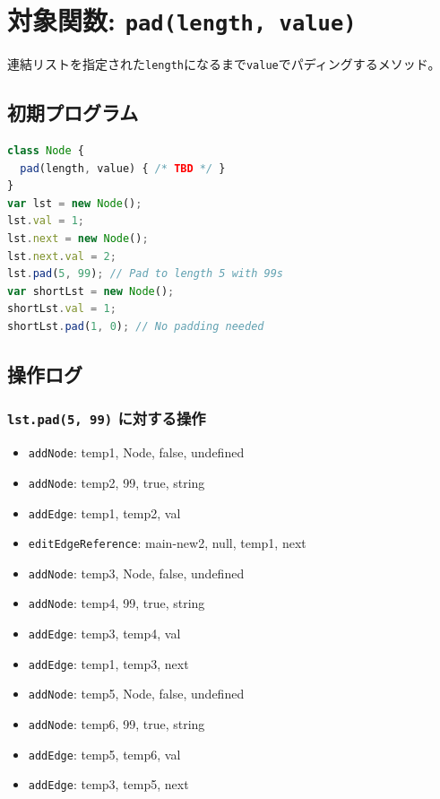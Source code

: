 \documentclass{article}
\begin{document}

\section{対象関数: \texttt{pad(length, value)}}
連結リストを指定された\texttt{length}になるまで\texttt{value}でパディングするメソッド。

\subsection{初期プログラム}

\begin{lstlisting}[language=JavaScript]
class Node {
  pad(length, value) { /* TBD */ }
}
var lst = new Node(); 
lst.val = 1;
lst.next = new Node();
lst.next.val = 2;
lst.pad(5, 99); // Pad to length 5 with 99s
var shortLst = new Node();
shortLst.val = 1;
shortLst.pad(1, 0); // No padding needed
\end{lstlisting}

\subsection{操作ログ}

\subsubsection{\texttt{lst.pad(5, 99)} に対する操作}
\begin{itemize}
  \item \texttt{addNode}: temp1, Node, false, undefined
  \item \texttt{addNode}: temp2, 99, true, string
  \item \texttt{addEdge}: temp1, temp2, val
  \item \texttt{editEdgeReference}: main-new2, null, temp1, next
  \item \texttt{addNode}: temp3, Node, false, undefined
  \item \texttt{addNode}: temp4, 99, true, string
  \item \texttt{addEdge}: temp3, temp4, val
  \item \texttt{addEdge}: temp1, temp3, next
  \item \texttt{addNode}: temp5, Node, false, undefined
  \item \texttt{addNode}: temp6, 99, true, string
  \item \texttt{addEdge}: temp5, temp6, val
  \item \texttt{addEdge}: temp3, temp5, next
\end{itemize}
\end{document}
